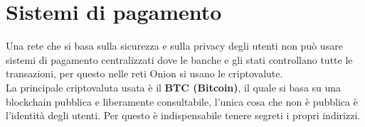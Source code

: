 \section{Sistemi di pagamento}
\begin{frame}
    Una rete che si basa sulla sicurezza e sulla privacy degli utenti non può usare sistemi di pagamento centralizzati dove le banche e gli stati controllano tutte le transazioni, per questo nelle reti Onion si usano le criptovalute. \\
    
    La principale criptovaluta usata è il \textbf{BTC (Bitcoin)}, il quale si basa su una blockchain pubblica e liberamente consultabile, l'unica cosa che non è pubblica è l'identità degli utenti. Per questo è indispensabile tenere segreti i propri indirizzi.
\end{frame}